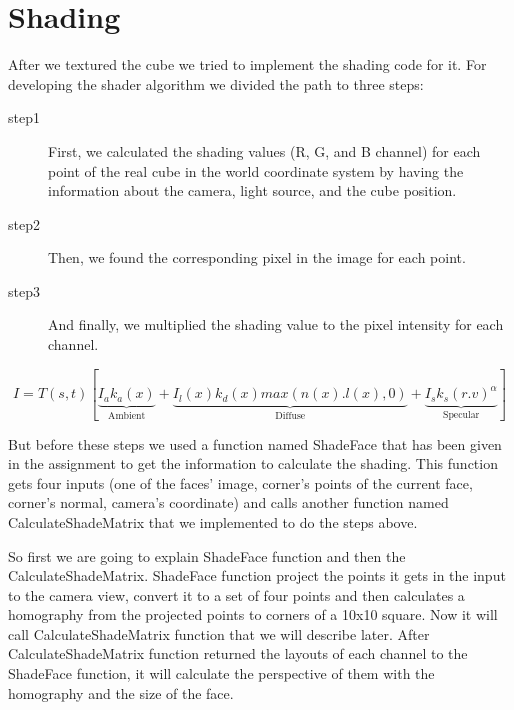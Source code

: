 \section{Shading}
After we textured the cube we tried to implement the shading code for it. For developing the shader algorithm we divided the path to three steps:
\begin{description}
  \item[step1] First, we calculated the shading values (R, G, and B channel) for each point of the real cube in the world coordinate system by having the information about the camera, light source, and the cube position.
  \item[step2] Then, we found the corresponding pixel in the image for each point.
  \item[step3] And finally, we multiplied the shading value to the pixel intensity for each channel.
\end{description}

\begin{equation}
I=T(s,t)[
\underbrace{
I_{a}k_{a}(x)
}_\text{Ambient}
+
\underbrace{
I_{l}(x)k_{d}(x)max(n(x).l(x),0)
}_\text{Diffuse}
+
\underbrace{
I_{s}k_{s}(r.v)^\alpha
  }_\text{Specular}
]
	\label{eq:phongReflection}
\end{equation}

But before these steps we used a function named ShadeFace that has been given in the assignment to get the information to calculate the shading. This function gets four inputs (one of the faces’ image, corner’s points of the current face, corner’s normal, camera’s coordinate) and calls another function named CalculateShadeMatrix that we implemented to do the steps above.

So first we are going to explain ShadeFace function and then the CalculateShadeMatrix. ShadeFace function project the points it gets in the input to the camera view, convert it to a set of four points and then calculates a homography from the projected points to corners of a 10x10 square. Now it will call CalculateShadeMatrix function that we will describe later. After CalculateShadeMatrix function returned the layouts of each channel to the ShadeFace function, it will calculate the perspective of them with the homography and the size of the face.

